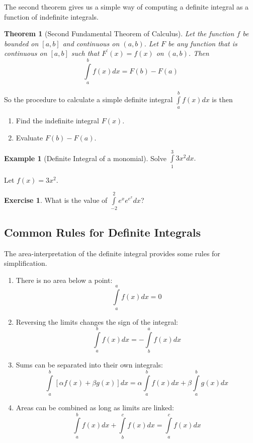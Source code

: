 \documentclass[
]{book}
\providecommand{\tightlist}{%
  \setlength{\itemsep}{0pt}\setlength{\parskip}{0pt}}
\newtheorem{theorem}{Theorem}[chapter]
\theoremstyle{definition}
\theoremstyle{definition}
\newtheorem{example}{Example}[chapter]
\theoremstyle{definition}
\newtheorem{exercise}{Exercise}[chapter]
\theoremstyle{definition}
\theoremstyle{remark}
\begin{document}
The second theorem gives us a simple way of computing a definite integral as a function of indefinite integrals.

\begin{theorem}[Second Fundamental Theorem of Calculus]
\protect\hypertarget{thm:unnamed-chunk-215}{}{\label{thm:unnamed-chunk-215} {} }Let the function \(f\) be bounded on \([a,b]\) and continuous on \((a,b)\). Let \(F\) be any function that is continuous on \([a,b]\) such that \(F^\prime(x)=f(x)\) on \((a,b)\). Then \[\int\limits_a^bf(x)dx = F(b)-F(a)\]
\end{theorem}

So the procedure to calculate a simple definite integral \(\int\limits_a^b f(x)dx\) is then

\begin{enumerate}
\def\labelenumi{\arabic{enumi}.}
\tightlist
\item
  Find the indefinite integral \(F(x)\).
\item
  Evaluate \(F(b)-F(a)\).
\end{enumerate}

\begin{example}[Definite Integral of a monomial]
\protect\hypertarget{exm:defintmon}{}{\label{exm:defintmon} {} }Solve \(\int\limits_1^3 3x^2 dx.\)

Let \(f(x) = 3x^2\).
\end{example}

\begin{exercise}
\protect\hypertarget{exr:unnamed-chunk-216}{}{\label{exr:unnamed-chunk-216} }What is the value of \(\int\limits_{-2}^2 e^x e^{e^x} dx\)?
\end{exercise}

\hypertarget{common-rules-for-definite-integrals}{%
\subsection*{Common Rules for Definite Integrals}\label{common-rules-for-definite-integrals}}

The area-interpretation of the definite integral provides some rules for simplification.

\begin{enumerate}
\def\labelenumi{\arabic{enumi}.}
\tightlist
\item
  There is no area below a point: \[\int\limits_a^a f(x)dx=0\]
\item
  Reversing the limits changes the sign of the integral: \[\int\limits_a^b f(x)dx=-\int\limits_b^a f(x)dx\]
\item
  Sums can be separated into their own integrals: \[\int\limits_a^b [\alpha f(x)+\beta g(x)]dx = \alpha \int\limits_a^b f(x)dx + \beta \int\limits_a^b g(x)dx\]
\item
  Areas can be combined as long as limits are linked: \[\int\limits_a^b f(x) dx +\int\limits_b^c f(x)dx = \int\limits_a^c f(x)dx\]
\end{enumerate}
\end{document}
